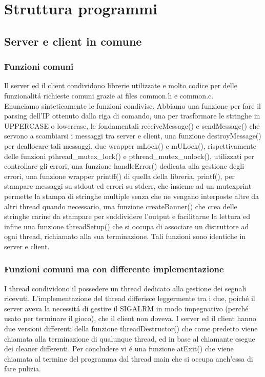\chapter{Struttura programmi}

\section{Server e client in comune}

\subsection{Funzioni comuni}

Il server ed il client condividono librerie utilizzate e molto codice per delle funzionalit\'a richieste comuni grazie ai files common.h e common.c. 
\\
Enunciamo sinteticamente le funzioni condivise. Abbiamo una funzione per fare il parsing dell'IP ottenuto dalla riga di comando, una per trasformare le stringhe in UPPERCASE o lowercase, le fondamentali receiveMessage() e sendMessage() che servono a scambiarsi i messaggi tra server e client, una funzione destroyMessage() per deallocare tali messaggi, due wrapper mLock() e mULock(), rispettivamente delle funzioni pthread\_mutex\_lock() e pthread\_mutex\_unlock(), utilizzati per controllare gli errori, una funzione handleError() dedicata alla gestione degli errori, una funzione wrapper printff() di quella della libreria, printf(), per stampare messaggi su stdout ed errori su stderr, che insieme ad un mutexprint permette la stampa di stringhe multiple senza che ne vengano interposte altre da altri thread quando necessario, una funzione createBanner() che crea delle stringhe carine da stampare per suddividere l'output e facilitarne la lettura ed infine una funzione threadSetup() che si occupa di associare un distruttore ad ogni thread, richiamato alla sua terminazione. Tali funzioni sono identiche in server e client.
 
 \subsection{Funzioni comuni ma con differente implementazione}

 I thread condividono il possedere un thread dedicato alla gestione dei segnali ricevuti. L'implementazione del thread differisce leggermente tra i due, poich\'e il server aveva la necessit\'a di gestire il SIGALRM in modo impegnativo (perch\'e usato per terminare il gioco), che il client non doveva. I server ed il client hanno due versioni differenti della funzione threadDestructor() che come predetto viene chiamata alla terminazione di qualunque thread, ed in base al chiamante esegue dei cleaner differenti. Per concludere vi \'e una funzione atExit() che viene chiamata al termine del programma dal thread main che si occupa anch'essa di fare pulizia.
 
